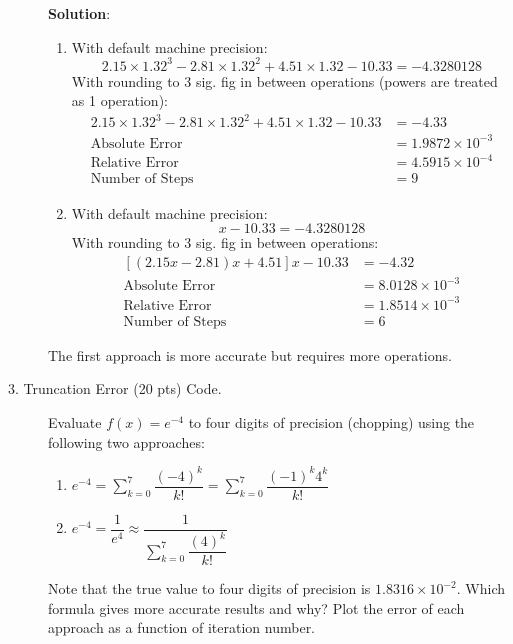 \documentclass[12pt]{article}
\newcommand{\ds}{\displaystyle}
\begin{document}
\begin{description}
    \color{red}
    \ifsolution
    {\bf Solution}:\\
    \begin{enumerate}[label=\textbf{(\alph*)}]
    \item With default machine precision:
    \begin{equation*}
        2.15 \times 1.32^3 - 2.81 \times 1.32^2 + 4.51 \times 1.32 - 10.33 = -4.3280128
    \end{equation*}
    With rounding to 3 sig. fig in between operations (powers are treated as 1 operation):
    \begin{equation*}
    \begin{split}
    2.15 \times 1.32^3 - 2.81 \times 1.32^2 + 4.51 \times 1.32 - 10.33 &= -4.33     \\
    \text{Absolute Error} &= 1.9872\times10^{-3} \\
    \text{Relative Error} &= 4.5915\times10^{-4}	\\
    \text{Number of Steps} &= 9
    \end{split}
    \end{equation*}
    \item With default machine precision:
        \begin{equation*}
            [(2.15 x - 2.81) x + 4.51] x - 10.33 = -4.3280128
        \end{equation*}
        With rounding to 3 sig. fig in between operations:
        \begin{equation*}
        \begin{split}
        [(2.15 x - 2.81) x + 4.51] x - 10.33 &= -4.32 \\
    \text{Absolute Error} &= 8.0128\times10^{-3} \\
    \text{Relative Error} &= 1.8514\times10^{-3} \\
    \text{Number of Steps} &= 6
    \end{split}
    \end{equation*}
    \end{enumerate}
    The first approach is more accurate but requires more operations.
    \fi
    \color{black}
    
\item[3. Truncation Error (20 pts) Code.] Evaluate $f (x) = e^{-4}$ to four digits of precision (chopping) using the following two approaches:
    \begin{enumerate}[label=\textbf{(\alph*)}]
    \item $e^{-4} = \ds\sum^7_{k = 0} \dfrac{(-4)^k}{k!} = \ds\sum^7_{k = 0} \dfrac{(-1)^k 4^k}{k!}$
    \item $e^{-4} = \dfrac{1}{e^4} \approx \dfrac{1}{\ds\sum^7_{k = 0} \dfrac{(4)^k}{k!}}$
    \end{enumerate}
    Note that the true value to four digits of precision is $1.8316 \times 10^{-2}$. Which formula gives more accurate results and why? Plot the error of each approach as a function of iteration number.


\end{description}
\end{document}
